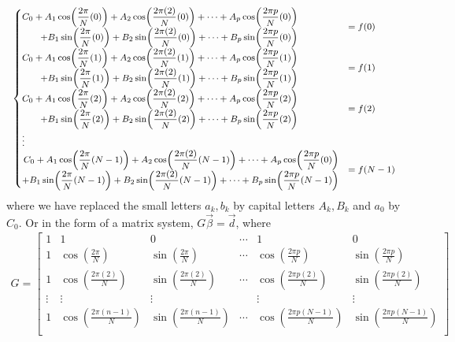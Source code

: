 \begin{align*}
\footnotesize
\begin{cases}
\begin{aligned} 
C_0 + A_1 \cos(\frac{2\pi}{N}(0)) + A_2 \cos(\frac{2\pi(2)}{N}(0)) + \cdots + A_p \cos(\frac{2\pi p}{N}(0)) \\
+ B_1 \sin(\frac{2\pi}{N}(0)) + B_2 \sin(\frac{2\pi(2)}{N}(0)) + \cdots + B_p \sin(\frac{2\pi p}{N}(0))
\end{aligned} &= f(0) \\
\begin{aligned} 
C_0 + A_1 \cos(\frac{2\pi}{N}(1)) + A_2 \cos(\frac{2\pi(2)}{N}(1)) + \cdots + A_p \cos(\frac{2\pi p}{N}(1)) \\
+ B_1 \sin(\frac{2\pi}{N}(1)) + B_2 \sin(\frac{2\pi(2)}{N}(1)) + \cdots + B_p \sin(\frac{2\pi p}{N}(1))
\end{aligned} &= f(1) \\
\begin{aligned} 
C_0 + A_1 \cos(\frac{2\pi}{N}(2)) + A_2 \cos(\frac{2\pi(2)}{N}(2)) + \cdots + A_p \cos(\frac{2\pi p}{N}(2)) \\
+ B_1 \sin(\frac{2\pi}{N}(2)) + B_2 \sin(\frac{2\pi(2)}{N}(2)) + \cdots + B_p \sin(\frac{2\pi p}{N}(2))
\end{aligned} &= f(2) \\
\vdots \\
\begin{aligned} 
C_0 + A_1 \cos(\frac{2\pi}{N}(N-1)) + A_2 \cos(\frac{2\pi(2)}{N}(N-1)) + \cdots + A_p \cos(\frac{2\pi p}{N}(0)) \\
+ B_1 \sin(\frac{2\pi}{N}(N-1)) + B_2 \sin(\frac{2\pi(2)}{N}(N-1)) + \cdots + B_p \sin(\frac{2\pi p}{N}(N-1))
\end{aligned} &= f(N-1)
\end{cases}
\end{align*} 
where we have replaced the small letters $a_k, b_k$ by capital letters $A_k, B_k$ and $a_0$ by $C_0$. Or in the form of a matrix system, $G\vec{\beta} = \vec{d}$, where
\begin{align*}
G =
\begin{bmatrix}
1 & 1 & 0 & \cdots & 1 & 0 \\
1 & \cos(\frac{2\pi}{N}) & \sin(\frac{2\pi}{N}) & \cdots & \cos(\frac{2\pi p}{N}) & \sin(\frac{2\pi p}{N}) \\
1 & \cos(\frac{2\pi(2)}{N}) & \sin(\frac{2\pi(2)}{N}) & \cdots & \cos(\frac{2\pi p (2)}{N}) & \sin(\frac{2\pi p (2)}{N}) \\
\vdots & \vdots & \vdots & & \vdots & \vdots \\
1 & \cos(\frac{2\pi(n-1)}{N}) & \sin(\frac{2\pi(n-1)}{N}) & \cdots & \cos(\frac{2\pi p(N-1)}{N}) & \sin(\frac{2\pi p(N-1)}{N}) \\
\end{bmatrix}
\end{align*}
